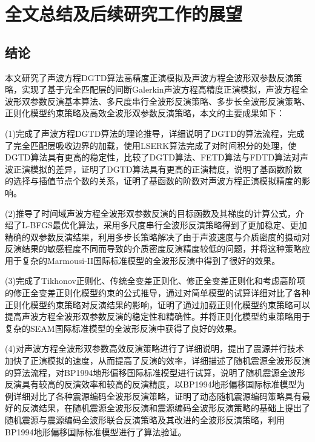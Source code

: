 \documentclass[12pt]{article}
\begin{document}
\setcounter{figure}{0}
\setcounter{table}{0}
\setcounter{algorithm}{0}
\newpage
\section{全文总结及后续研究工作的展望}
\subsection{结论}
本文研究了声波方程DGTD算法高精度正演模拟及声波方程全波形双参数反演策略，实现了基于完全匹配层的间断Galerkin声波方程高精度正演模拟，声波方程全波形双参数反演基本算法、多尺度串行全波形反演策略、多步长全波形反演策略、正则化模型约束策略及高效全波形双参数反演策略，本文的主要成果如下：
\par
(1)完成了声波方程DGTD算法的理论推导，详细说明了DGTD的算法流程，完成了完全匹配层吸收边界的加载，使用LSERK算法完成了对时间积分的处理，使DGTD算法具有更高的稳定性，比较了DGTD算法、FETD算法与FDTD算法对声波正演模拟的差异，证明了DGTD算法具有更高的正演精度，说明了基函数阶数的选择与插值节点个数的关系，证明了基函数的阶数对声波方程正演模拟精度的影响。
\par
(2)推导了时间域声波方程全波形双参数反演的目标函数及其梯度的计算公式，介绍了L-BFGS最优化算法，采用多尺度串行全波形反演策略得到了更加稳定、更加精确的双参数反演结果，利用多步长策略解决了由于声波速度与介质密度的摄动对反演结果的敏感程度不同而导致的介质密度反演精度较低的问题，并将这种策略应用于复杂的Marmousi-II国际标准模型的全波形反演中得到了很好的效果。
\par
(3)完成了Tikhonov正则化、传统全变差正则化、修正全变差正则化和考虑高阶项的修正全变差正则化模型约束的公式推导，通过对简单模型的试算详细对比了各种正则化模型约束策略对反演结果的影响，证明了通过加载正则化模型约束策略可以提高声波方程全波形双参数反演的稳定性和精确性。并将正则化模型约束策略用于复杂的SEAM国际标准模型的全波形反演中获得了良好的效果。
\par
(4)对声波方程全波形双参数高效反演策略进行了详细说明，提出了震源并行技术加快了正演模拟的速度，从而提高了反演的效率，详细描述了随机震源全波形反演的算法流程，对BP1994地形偏移国际标准模型进行试算，说明了随机震源全波形反演具有较高的反演效率和较高的反演精度，以BP1994地形偏移国际标准模型为例详细对比了各种震源编码全波形反演策略，证明了动态随机震源编码策略具有最好的反演结果，在随机震源全波形反演和震源编码全波形反演策略的基础上提出了随机震源与震源编码全波形联合反演策略及其改进的全波形反演策略，利用BP1994地形偏移国际标准模型进行了算法验证。
\end{document}
